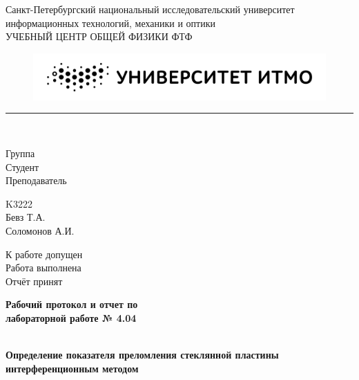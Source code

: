 \documentclass{article}
\begin{document}
\begin{minipage}{0.62\textwidth}
    \begin{center}
        Санкт-Петербургский национальный исследовательский университет \\
        информационных технологий, механики и оптики \\
        УЧЕБНЫЙ ЦЕНТР ОБЩЕЙ ФИЗИКИ ФТФ
    \end{center}
\end{minipage}
\hfill
\begin{minipage}{0.38\textwidth}
    \centering
    \begin{figure}[H]
    \includegraphics[width=\textwidth]{logo.png}
    \end{figure}
\end{minipage}

\rule{\textwidth}{1pt} \\

\begin{minipage}{0.16\textwidth}
        Группа \hrulefill\\
        Студент \hrulefill\\
        Преподаватель \hrulefill
\end{minipage}%
\begin{minipage}{0.25\textwidth}
        K3222\hrulefill\\
        Бевз Т.А.\hrulefill\\
        Соломонов А.И.\hrulefill
\end{minipage}
\hfill
\begin{minipage}{0.47\textwidth}
        К работе допущен \hrulefill\\
        Работа выполнена \hrulefill\\
        Отчёт принят \hrulefill
\end{minipage}
\begin{center}
    \textbf{\huge Рабочий протокол и отчет по \\
    лабораторной работе № 4.04}
\end{center}
\begin{minipage}{1\textwidth}
        \hrulefill\\
        \Large\textbf{Определение показателя преломления стеклянной пластины интерференционным методом}\hrulefill
\end{minipage}
\end{document}
